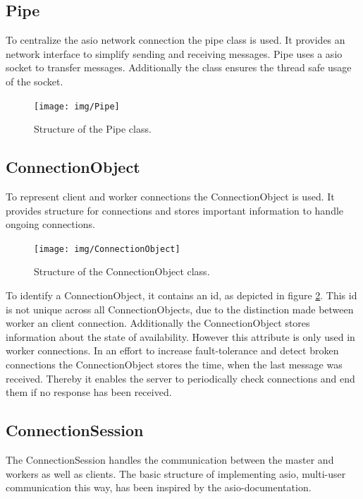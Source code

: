 \documentclass[12pt, letterpaper]{article}
\begin{document}
\subsection{Pipe}

To centralize the asio network connection the pipe class is used. It provides an network interface to simplify sending and receiving messages. Pipe uses a asio socket to transfer messages. Additionally the class ensures the thread safe usage of the socket. 

\begin{figure}[h]
	\centering
	\texttt{[image: img/Pipe]}
	\caption{Structure of the Pipe class.}
	\label{fig:classes_Pipe}
\end{figure}

\subsection{ConnectionObject}

To represent client and worker connections the ConnectionObject is used. It provides structure for connections and stores important information to handle ongoing connections. 

\begin{figure}[h]
	\centering
	\texttt{[image: img/ConnectionObject]}
	\caption{Structure of the ConnectionObject class.}
	\label{fig:classes_ConnectionObject}
\end{figure}

To identify a ConnectionObject, it contains an id, as depicted in figure \ref{fig:classes_ConnectionObject}. This id is not unique across all ConnectionObjects, due to the distinction made between worker an client connection. Additionally the ConnectionObject stores information about the state of availability. However this attribute is only used in worker connections.\newline
In an effort to increase fault-tolerance and detect broken connections the ConnectionObject stores the time, when the last message was received. Thereby it enables the server to periodically check connections and end them if no response has been received.

\subsection{ConnectionSession}

The ConnectionSession handles the communication between the master and workers as well as clients.
The basic structure of implementing asio, multi-user communication this way, has been inspired by the asio-documentation.
\end{document}
